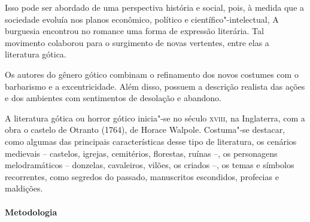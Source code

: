 \documentclass[12pt]{extarticle}
\begin{document}
Isso pode ser abordado de uma perspectiva história e social, pois, à
medida que a sociedade evoluía nos planos econômico, político e
científico"-intelectual, A burguesia encontrou no romance uma forma de
expressão literária. Tal movimento colaborou para o surgimento de novas
vertentes, entre elas a literatura gótica.

Os autores do gênero gótico combinam o refinamento dos novos costumes
com o barbarismo e a excentricidade. Além disso, possuem a descrição
realista das ações e dos ambientes com sentimentos de desolação e
abandono.

A literatura gótica ou horror gótico inicia"-se no século \textsc{xviii}, na
Inglaterra, com a obra o castelo de Otranto (1764), de Horace Walpole.
Costuma"-se destacar, como algumas das principais características desse
tipo de literatura, os cenários medievais -- castelos, igrejas,
cemitérios, florestas, ruínas --, os personagens melodramáticos -- donzelas,
cavaleiros, vilões, os criados --, os temas e símbolos recorrentes, como segredos do 
passado, manuscritos escondidos, profecias e maldições.


\paragraph{Metodologia}
\end{document}

